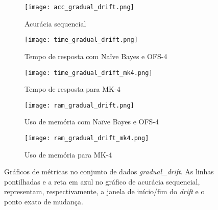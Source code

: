 \begin{figure}[!htb]
\centering
\begin{subfigure}{0.485\textwidth}
\texttt{[image: acc\_gradual\_drift.png]}
\caption{Acurácia sequencial} \label{fig:gradual_1a}
\end{subfigure}
\hfill
\begin{minipage}[b]{\textwidth} 
\begin{subfigure}[t]{0.485\textwidth}
\texttt{[image: time\_gradual\_drift.png]}
\caption{Tempo de resposta com Naïve Bayes e OFS-4} \label{fig:gradual_1b}
\end{subfigure}
\hfill
\begin{subfigure}[t]{0.485\textwidth}
\texttt{[image: time\_gradual\_drift\_mk4.png]}
\caption{Tempo de resposta para MK-4} \label{fig:gradual_1c}
\end{subfigure}
\hfill
\begin{subfigure}[t]{0.485\textwidth}
\texttt{[image: ram\_gradual\_drift.png]}
\caption{Uso de memória com Naïve Bayes e OFS-4} \label{fig:gradual_1d}
\end{subfigure}
\hfill
\begin{subfigure}[t]{0.485\textwidth}
\texttt{[image: ram\_gradual\_drift\_mk4.png]}
\caption{Uso de memória para MK-4} \label{fig:gradual_1e}
\end{subfigure}
\end{minipage}

\caption[Gráficos de métricas no conjunto de dados \textit{gradual\_drift}]{Gráficos de métricas no conjunto de dados \textit{gradual\_drift}. As linhas pontilhadas e a reta em azul no gráfico de acurácia sequencial, representam, respectivamente, a janela de início/fim do \textit{drift} e o ponto exato de mudança. %
} \label{fig:gradual_drift}
\end{figure}



